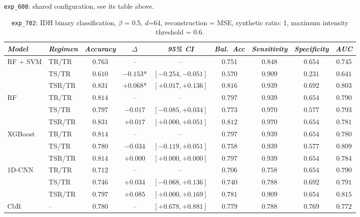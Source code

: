 \texttt{exp\_608}: shared configuration, see its table above.

\begin{table}[H]
\centering
\scriptsize

\label{tab:ctrl_exp_702}
\begin{tabular*}{\textwidth}{@{\extracolsep{\fill}}llccccccc}
\toprule
\emph{Model} & \emph{Regimen} & \emph{Accuracy} & \emph{$\Delta$} & \emph{95\% CI} & \emph{Bal.\ Acc} & \emph{Sensitivity} & \emph{Specificity} & \emph{AUC}\\
\midrule
\multirow{3}{*}{RF + SVM} & TR/TR & $0.763$ & -- & -- & $0.751$ & $0.848$ & $0.654$ & $0.745$\\
 & TS/TR & $0.610$ & $-0.153$* & $[-0.254, -0.051]$ & $0.570$ & $0.909$ & $0.231$ & $0.641$\\
 & TSR/TR & $0.831$ & $+0.068$* & $[+0.017, +0.136]$ & $0.816$ & $0.939$ & $0.692$ & $0.803$\\
\midrule
\multirow{3}{*}{RF} & TR/TR & $0.814$ & -- & -- & $0.797$ & $0.939$ & $0.654$ & $0.790$\\
 & TS/TR & $0.797$ & $-0.017$ & $[-0.085, +0.034]$ & $0.773$ & $0.970$ & $0.577$ & $0.793$\\
 & TSR/TR & $0.831$ & $+0.017$ & $[+0.000, +0.051]$ & $0.812$ & $0.970$ & $0.654$ & $0.781$\\
\midrule
\multirow{3}{*}{XGBoost} & TR/TR & $0.814$ & -- & -- & $0.797$ & $0.939$ & $0.654$ & $0.780$\\
 & TS/TR & $0.780$ & $-0.034$ & $[-0.119, +0.051]$ & $0.758$ & $0.939$ & $0.577$ & $0.809$\\
 & TSR/TR & $0.814$ & $+0.000$ & $[+0.000, +0.000]$ & $0.797$ & $0.939$ & $0.654$ & $0.784$\\
\midrule
\multirow{3}{*}{1D-CNN} & TR/TR & $0.712$ & -- & -- & $0.706$ & $0.758$ & $0.654$ & $0.790$\\
 & TS/TR & $0.746$ & $+0.034$ & $[-0.068, +0.136]$ & $0.740$ & $0.788$ & $0.692$ & $0.791$\\
 & TSR/TR & $0.797$ & $+0.085$ & $[+0.000, +0.169]$ & $0.781$ & $0.909$ & $0.654$ & $0.815$\\
\midrule
CbR & -- & $0.780$ & -- & $[+0.678, +0.881]$ & $0.779$ & $0.788$ & $0.769$ & $0.772$\\
\bottomrule
\end{tabular*}
\caption{\small \texttt{exp\_702}: IDH binary classification, $\beta$ = 0.5, $d$=64, reconstruction = MSE, synthetic ratio: 1, maximum intensity threshold = 0.6.}
\end{table}

